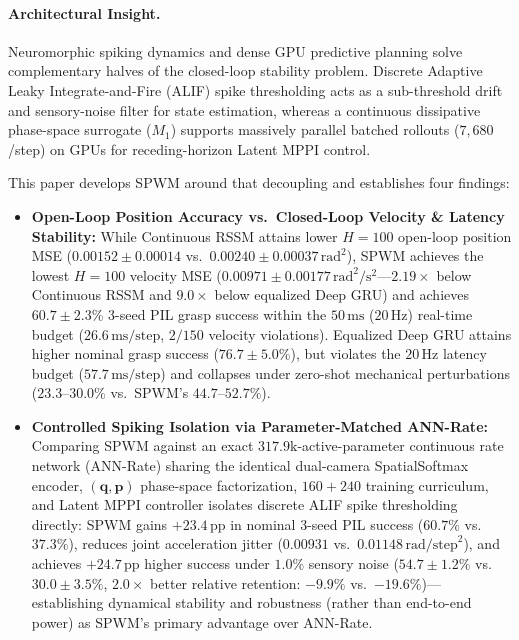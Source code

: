 \documentclass[11pt]{article}
\begin{document}
\paragraph{Architectural Insight.} Neuromorphic spiking dynamics and dense GPU predictive planning solve complementary halves of the closed-loop stability problem. Discrete Adaptive Leaky Integrate-and-Fire (ALIF) spike thresholding acts as a sub-threshold drift and sensory-noise filter for state estimation, whereas a continuous dissipative phase-space surrogate ($M_1$) supports massively parallel batched rollouts ($7{,}680$/step) on GPUs for receding-horizon Latent MPPI control.

This paper develops SPWM around that decoupling and establishes four findings:

\begin{itemize}
    \item \textbf{Open-Loop Position Accuracy vs.\ Closed-Loop Velocity \& Latency Stability:} While Continuous RSSM attains lower $H=100$ open-loop position MSE ($0.00152 \pm 0.00014$ vs.\ $0.00240 \pm 0.00037\,\text{rad}^2$), SPWM achieves the lowest $H=100$ velocity MSE ($0.00971 \pm 0.00177\,\text{rad}^2/\text{s}^2$---$2.19\times$ below Continuous RSSM and $9.0\times$ below equalized Deep GRU) and achieves $60.7 \pm 2.3\%$ 3-seed PIL grasp success within the $50\,\text{ms}$ ($20\,\text{Hz}$) real-time budget ($26.6\,\text{ms/step}$, $2/150$ velocity violations). Equalized Deep GRU attains higher nominal grasp success ($76.7 \pm 5.0\%$), but violates the $20\,\text{Hz}$ latency budget ($57.7\,\text{ms/step}$) and collapses under zero-shot mechanical perturbations ($23.3\text{--}30.0\%$ vs.\ SPWM's $44.7\text{--}52.7\%$).
    \item \textbf{Controlled Spiking Isolation via Parameter-Matched ANN-Rate:} Comparing SPWM against an exact $317.9\text{k}$-active-parameter continuous rate network (ANN-Rate) sharing the identical dual-camera SpatialSoftmax encoder, $(\mathbf{q}, \mathbf{p})$ phase-space factorization, $160+240$ training curriculum, and Latent MPPI controller isolates discrete ALIF spike thresholding directly: SPWM gains $+23.4\,\text{pp}$ in nominal 3-seed PIL success ($60.7\%$ vs.\ $37.3\%$), reduces joint acceleration jitter ($0.00931$ vs.\ $0.01148\,\text{rad/step}^2$), and achieves $+24.7\,\text{pp}$ higher success under $1.0\%$ sensory noise ($54.7 \pm 1.2\%$ vs.\ $30.0 \pm 3.5\%$, $2.0\times$ better relative retention: $-9.9\%$ vs.\ $-19.6\%$)---establishing dynamical stability and robustness (rather than end-to-end power) as SPWM's primary advantage over ANN-Rate.

\end{itemize}
\end{document}
